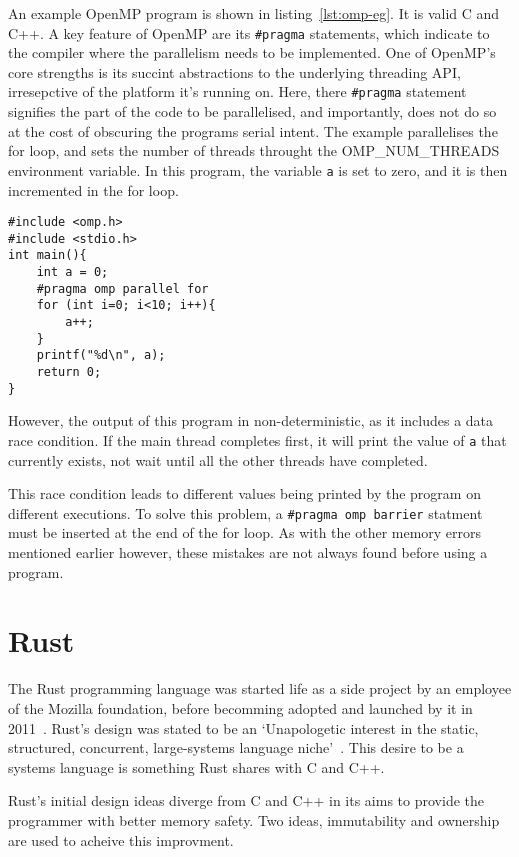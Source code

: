 An example OpenMP program is shown in listing~\ref{lst:omp-eg}. It is valid C and C++. A key feature of OpenMP are its \texttt{\#pragma} statements, which indicate to the compiler where the parallelism needs to be implemented.
One of OpenMP's core strengths is its succint abstractions to the underlying threading API, irresepctive of the platform it's running on. Here, there \texttt{\#pragma} statement signifies the part of the code to be parallelised, and importantly, does not do so at the cost of obscuring the programs serial intent.
The example parallelises the for loop, and sets the number of threads throught the OMP\_NUM\_THREADS environment variable. In this program, the variable \texttt{a} is set to zero, and it is then incremented in the for loop.

\begin{code}
\begin{verbatim}
#include <omp.h>
#include <stdio.h>
int main(){
    int a = 0;
    #pragma omp parallel for
    for (int i=0; i<10; i++){
        a++;
    }
    printf("%d\n", a);
    return 0;
}
\end{verbatim}
\label{lst:omp-eg}
\end{code}

However, the output of this program in non-deterministic, as it includes a data race condition. If the main thread completes first, it will print the value of \texttt{a} that currently exists, not wait until all the other threads have completed. 

This race condition leads to different values being printed by the program on different executions. To solve this problem, a \texttt{\#pragma omp barrier} statment must be inserted at the end of the for loop. As with the other memory errors mentioned earlier however, these mistakes are not always found before using a program.

\section{Rust}
The Rust programming language was started life as a side project by an employee of the Mozilla foundation, before becomming adopted and launched by it in 2011~\cite{FutureTense}. Rust's design was stated to be an `Unapologetic interest in the static, structured, concurrent, large-systems language niche'~\cite{pServo}. This desire to be a systems language is something Rust shares with C and C++.

Rust's initial design ideas diverge from C and C++ in its aims to provide the programmer with better memory safety. Two ideas, immutability and ownership are used to acheive this improvment. 

